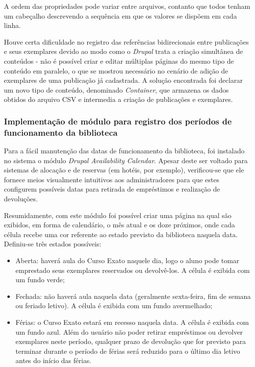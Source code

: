 \documentclass[a4paper]{article}
\begin{document}
A ordem das propriedades pode variar entre arquivos, contanto que todos tenham um cabeçalho descrevendo a sequência em que os valores se dispõem em cada linha.

Houve certa dificuldade no registro das referências bidirecionais entre publicações e seus exemplares devido ao modo como o \textit{Drupal} trata a criação simultânea de  conteúdos - não é possível criar e editar múltiplas páginas do mesmo tipo de conteúdo em paralelo, o que se mostrou necessário no cenário de adição de exemplares de uma publicação já cadastrada. A solução encontrada foi declarar um novo tipo de conteúdo, denominado \textit{Container}, que armazena os dados obtidos do arquivo CSV e intermedia a criação de publicações e exemplares.

\subsubsection{Implementação de módulo para registro dos períodos de funcionamento da biblioteca}
Para a fácil manutenção das datas de funcionamento da biblioteca, foi instalado no sistema o módulo \textit{Drupal Availability Calendar}. Apesar deste ser voltado para sistemas de alocação e de reservas (em hotéis, por exemplo), verificou-se que ele fornece meios visualmente intuitivos aos administradores para que estes configurem possíveis datas para retirada de empréstimos e realização de devoluções.

Resumidamente, com este módulo foi possível criar uma página na qual são exibidos, em forma de calendário, o mês atual e os doze próximos, onde cada célula recebe uma cor referente ao estado previsto da biblioteca naquela data. Definiu-se três estados possíveis:

\begin{itemize}
\item Aberta: haverá aula do Curso Exato naquele dia, logo o aluno pode tomar emprestado seus exemplares reservados ou devolvê-los. A célula é exibida com um fundo verde;
\item Fechada: não haverá aula naquela data (geralmente sexta-feira, fim de semana ou feriado letivo). A célula é exibida com um fundo avermelhado;
\item Férias: o Curso Exato estará em recesso naquela data. A célula é exibida com um fundo azul. Além do usuário não poder retirar empréstimos ou devolver exemplares neste período, qualquer prazo de devolução que for previsto para terminar durante o período de férias será reduzido para o último dia letivo antes do início das férias.
\end{itemize}
\end{document}
